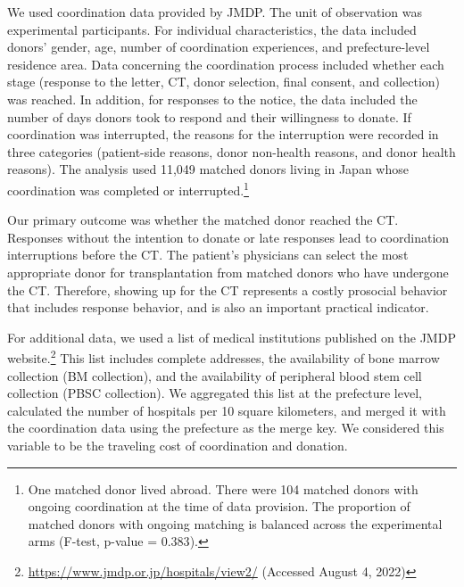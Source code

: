 \documentclass[12pt, a4paper]{article}
\begin{document}
We used coordination data provided by JMDP. The unit of observation was experimental participants. For individual characteristics, the data included donors' gender, age, number of coordination experiences, and prefecture-level residence area. Data concerning the coordination process included whether each stage (response to the letter, CT, donor selection, final consent, and collection) was reached. In addition, for responses to the notice, the data included the number of days donors took to respond and their willingness to donate. If coordination was interrupted, the reasons for the interruption were recorded in three categories (patient-side reasons, donor non-health reasons, and donor health reasons). The analysis used 11,049 matched donors living in Japan whose coordination was completed or interrupted.\footnote{One matched donor lived abroad. There were 104 matched donors with ongoing coordination at the time of data provision. The proportion of matched donors with ongoing matching is balanced across the experimental arms (F-test, p-value = \(0.383\)).}

Our primary outcome was whether the matched donor reached the CT. Responses without the intention to donate or late responses lead to coordination interruptions before the CT. The patient's physicians can select the most appropriate donor for transplantation from matched donors who have undergone the CT. Therefore, showing up for the CT represents a costly prosocial behavior that includes response behavior, and is also an important practical indicator.

For additional data, we used a list of medical institutions published on the JMDP website.\footnote{\url{https://www.jmdp.or.jp/hospitals/view2/} (Accessed August 4, 2022)} This list includes complete addresses, the availability of bone marrow collection (BM collection), and the availability of peripheral blood stem cell collection (PBSC collection). We aggregated this list at the prefecture level, calculated the number of hospitals per 10 square kilometers, and merged it with the coordination data using the prefecture as the merge key. We considered this variable to be the traveling cost of coordination and donation.
\end{document}
